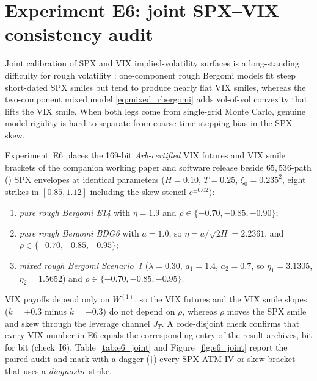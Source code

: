 \section{Experiment E6: joint SPX--VIX consistency audit}
\label{sec:joint}

Joint calibration of SPX and VIX implied-volatility surfaces is a long-standing difficulty for rough volatility \citep{Guyon2020,Romer2022,BourgeyDeMarcoGobet2023,AbiJaberIllandLi2025}: one-component rough Bergomi models fit steep short-dated SPX smiles but tend to produce nearly flat VIX smiles, whereas the two-component mixed model \eqref{eq:mixed_rbergomi} adds vol-of-vol convexity that lifts the VIX smile. When both legs come from single-grid Monte Carlo, genuine model rigidity is hard to separate from coarse time-stepping bias in the SPX skew.

Experiment~E6 places the 169-bit \emph{Arb-certified} VIX futures and VIX smile brackets of the companion working paper and software release \RoughCert{} \CompanionTag{} \citep{AhmedEtAl2026RoughCert} beside $65{,}536$-path \RCBridge{} (\RCCE{}) SPX envelopes at identical parameters ($H=0.10$, $T=0.25$, $\xi_0=0.235^2$, eight strikes in $[0.85,1.12]$ including the skew stencil $e^{\pm 0.02}$):
\begin{enumerate}[1.]
  \item \emph{pure rough Bergomi E14} with $\eta=1.9$ and $\rho\in\{-0.70,\allowbreak -0.85,\allowbreak -0.90\}$;
  \item \emph{pure rough Bergomi BDG6} with $a=1.0$, so $\eta=a/\sqrt{2H}=2.2361$, and $\rho\in\{-0.70,\allowbreak -0.85,\allowbreak -0.95\}$;
  \item \emph{mixed rough Bergomi Scenario~1} ($\lambda=0.30$, $a_1=1.4$, $a_2=0.7$, so $\eta_1=3.1305$, $\eta_2=1.5652$) and $\rho\in\{-0.70,\allowbreak -0.85,\allowbreak -0.95\}$.
\end{enumerate}
VIX payoffs depend only on $W^{(1)}$, so the VIX futures and the VIX smile slopes ($k=+0.3$ minus $k=-0.3$) do not depend on $\rho$, whereas $\rho$ moves the SPX smile and skew through the leverage channel $J_T$. A code-disjoint check confirms that every VIX number in E6 equals the corresponding entry of the \RoughCert{} \CompanionTag{} result archives, bit for bit (check~I6). Table~\ref{tab:e6_joint} and Figure~\ref{fig:e6_joint} report the paired audit and mark with a dagger ($\dagger$) every SPX ATM IV or skew bracket that uses a \emph{diagnostic} strike.

%

